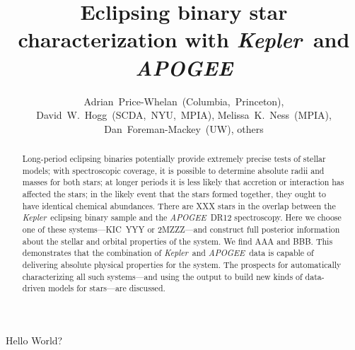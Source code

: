 \documentclass[12pt,letterpaper,preprint]{aastex}
\newcommand{\acronym}[1]{{\small{#1}}}
\newcommand{\project}[1]{\textsl{#1}}
\newcommand{\kepler}{\project{Kepler}}
\newcommand{\apogee}{\project{\acronym{APOGEE}}}
\begin{document}
\title{Eclipsing binary star characterization with \kepler\ and \apogee}
\author{
  Adrian~Price-Whelan~(Columbia,~Princeton),
  David~W.~Hogg~(SCDA,~NYU,~MPIA),
  Melissa~K.~Ness~(MPIA),
  Dan~Foreman-Mackey~(UW), others}

\begin{abstract}
Long-period eclipsing binaries potentially provide extremely precise
tests of stellar models; with spectroscopic coverage, it is possible
to determine absolute radii and masses for both stars; at longer
periods it is less likely that accretion or interaction has affected
the stars; in the likely event that the stars formed together, they
ought to have identical chemical abundances.
There are XXX stars in the overlap between the \kepler\ eclipsing
binary sample and the \apogee\ \acronym{DR12} spectroscopy.
Here we choose one of these systems---KIC~YYY or 2MZZZ---and construct
full posterior information about the stellar and orbital properties of
the system.
We find AAA and BBB.
This demonstrates that the combination of \kepler\ and \apogee\ data
is capable of delivering absolute physical properties for the system.
The prospects for automatically characterizing all such systems---and
using the output to build new kinds of data-driven models for
stars---are discussed.
\end{abstract}

Hello World?
\end{document}
